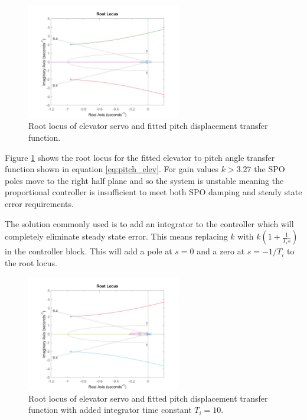\documentclass{article}
\begin{document}
\begin{figure}[H]
    \centering
    \includegraphics[width=0.6\textwidth]{figures/pitch_autopilot_locus_bad.png}
    \caption{Root locus of elevator servo and fitted pitch displacement transfer function.}
    \label{fig:fitted_pitchrate_rlocus}
\end{figure}

Figure \ref{fig:fitted_pitchrate_rlocus} shows the root locus for the fitted elevator to pitch angle transfer function shown in equation \ref{eq:pitch_elev}.
For gain values $k>3.27$ the SPO poles move to the right half plane and so the system is unstable meaning the proportional controller is insufficient to meet both SPO damping and steady state error requirements.

The solution commonly used is to add an integrator to the controller which will completely eliminate steady state error.
This means replacing $k$ with $k(1 + \frac{1}{T_i s})$ in the controller block.
This will add a pole at $s=0$ and a zero at $s=-1/T_i$ to the root locus.

\begin{figure}[H]
    \centering
    \includegraphics[width=0.6\textwidth]{figures/pitch_autopilot_locus_intbad.png}
    \caption{Root locus of elevator servo and fitted pitch displacement transfer function with added integrator time constant $T_i = 10$.}
    \label{fig:fitted_pitchrate_rlocus_int}
\end{figure}
\end{document}
